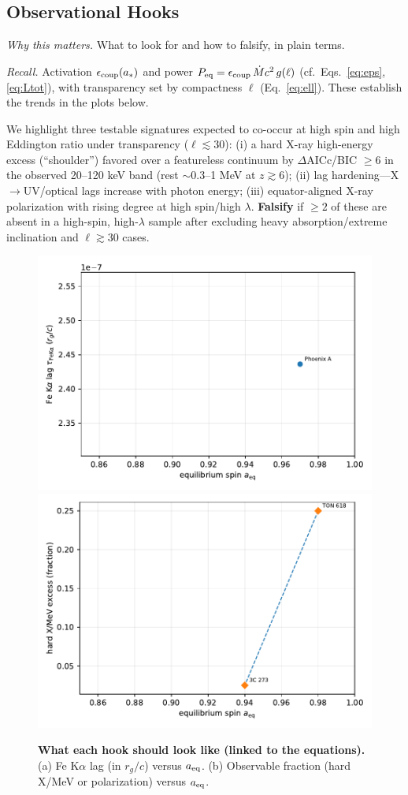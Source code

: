 \documentclass[twocolumn]{aastex701}
\begin{document}
\clearpage
\subsection{Observational Hooks}\label{sec:obs}
\suppressfloats[t]  %

\noindent\textit{Why this matters.} What to look for and how to falsify, in plain terms.

\noindent\textit{Recall.}
Activation $\epsilon_{\rm coup}(a_\ast)$ and power $P_{\rm eq}=\epsilon_{\rm coup}\,\dot{M}c^2\,g(\ell)$
(cf.\ Eqs.~\eqref{eq:eps}, \eqref{eq:Ltot}), with transparency set by compactness $\ell$ (Eq.~\eqref{eq:ell}).
These establish the trends in the plots below.

We highlight three testable signatures expected to co-occur at high spin and high Eddington ratio under transparency ($\ell\!\lesssim\!30$):
(i) a hard X-ray high-energy excess (“shoulder”) favored over a featureless continuum by $\Delta$AICc/BIC $\ge 6$ in the observed 20–120 keV band (rest $\sim$0.3–1 MeV at $z\gtrsim6$);
(ii) lag hardening—X$\to$UV/optical lags increase with photon energy;
(iii) equator-aligned X-ray polarization with rising degree at high spin/high $\lambda$.
\textbf{Falsify} if $\ge2$ of these are absent in a high-spin, high-$\lambda$ sample after excluding heavy absorption/extreme inclination and $\ell\!\gtrsim\!30$ cases.
\begin{figure}[t!]
  \vspace*{2pt}
  \centering
  \includegraphics[width=.49\columnwidth]{Fig5a.pdf}
  \hfill
  \includegraphics[width=.49\columnwidth]{Fig5b.pdf}
  \caption{\textbf{What each hook should look like (linked to the equations).} 
  (a) Fe K$\alpha$ lag (in $r_g/c$) versus $a_{\rm eq}$. 
  (b) Observable fraction (hard X/MeV or polarization) versus $a_{\rm eq}$.}
  \label{fig:fig5}
\end{figure}
\end{document}
